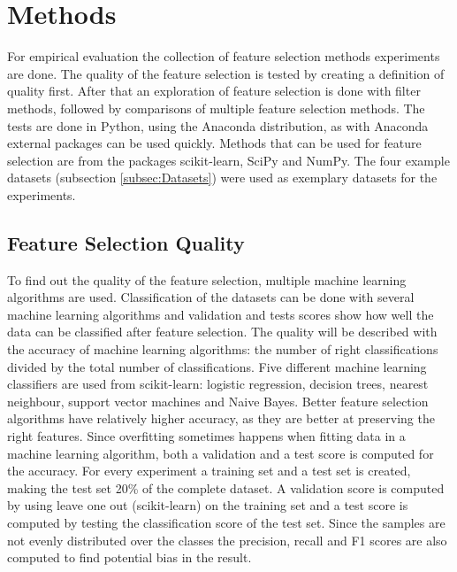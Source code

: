 \documentclass[10pt,a4paper]{article}
\begin{document}
	\newpage
	\section{Methods}
	\label{sec:Methods}

	For empirical evaluation the collection of feature selection methods experiments are done. The quality of the feature selection is tested by creating a definition of quality first. After that an exploration of feature selection is done with filter methods, followed by comparisons of multiple feature selection methods. The tests are done in Python, using the Anaconda distribution, as with Anaconda external packages can be used quickly. Methods that can be used for feature selection are from the packages scikit-learn\cite{pedregosa2011scikit}, SciPy\cite{jones2014scipy} and NumPy\cite{walt2011numpy}. The four example datasets (subsection \ref{subsec:Datasets}) were used as exemplary datasets for the experiments.
	
	\subsection{Feature Selection Quality}
	\label{subsec:DimensionalityReductionQuality}
	
	To find out the quality of the feature selection, multiple machine learning algorithms are used\cite{hall1998practical}.  Classification of the datasets can be done with several machine learning algorithms and validation and tests scores show how well the data can be classified after feature selection. The quality will be described with the accuracy of machine learning algorithms: the number of right classifications divided by the total number of classifications. Five different machine learning classifiers are used from scikit-learn: logistic regression, decision trees, nearest neighbour, support vector machines and Naive Bayes. Better feature selection algorithms have relatively higher accuracy, as they are better at preserving the right features. Since overfitting sometimes happens when fitting data in a machine learning algorithm, both a validation and a test score is computed for the accuracy. For every experiment a training set and a test set is created, making the test set 20\% of the complete dataset. A validation score is computed by using leave one out (scikit-learn) on the training set and a test score is computed by testing the classification score of the test set. Since the samples are not evenly distributed over the classes the precision, recall and F1 scores are also computed to find potential bias in the result.
\end{document}
